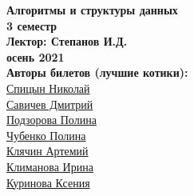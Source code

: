 


    \thispagestyle{empty}
    \BgThispage
    \begin{center}
        \vspace*{4cm}
        
        \Huge
        \textbf{Алгоритмы и структуры данных} \\
        \textbf{3 семестр} \\
        \textbf{Лектор: Степанов И.Д.} \\
        \textbf{осень 2021} \\
    
        
        \vspace{7cm}
        \Large
        \textbf{Авторы билетов (лучшие котики):} \\
        \href{https://vk.com/spitsynn}{Спицын Николай} \\
        \href{https://vk.com/dimasav123}{Савичев Дмитрий} \\
        \href{https://vk.com/id165779384}{Подзорова Полина} \\
        \href{https://vk.com/poli.dobro}{Чубенко Полина} \\
        \href{https://vk.com/id340504554}{Клячин Артемий} \\
        \href{https://vk.com/meraklim}{Климанова Ирина} \\
        \href{https://vk.com/ksinomorph}{Куринова Ксения} \\
        
    \end{center}

\newpage

\tableofcontents
\newpage





